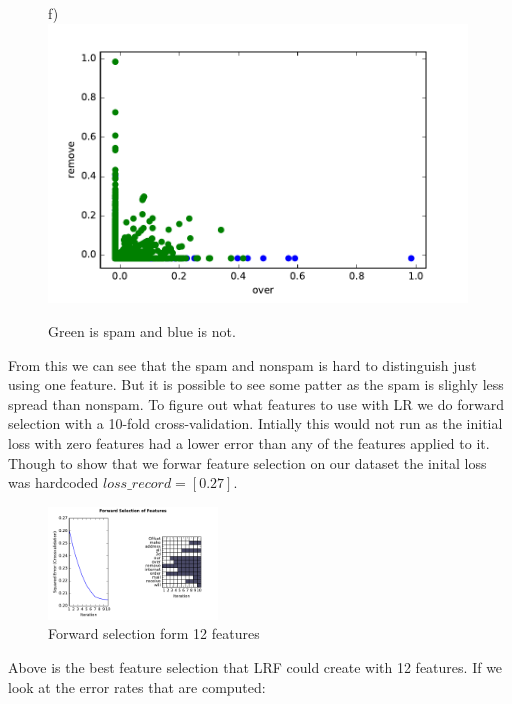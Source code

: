 \documentclass[10pt, paper=a4]{article}
\begin{document}
\begin{figure}[h]
\begin{minipage}{0.3\textwidth}
  \end{minipage} \hfill
  \begin{minipage}{0.3\textwidth}
    f)\\
    \includegraphics[width = 0.99\textwidth]{../../src/img/over_remove.pdf}
  \end{minipage} \vfill
    \caption{Green is spam and blue is not.}
  \label{fig:modelcheck}
\end{figure}

From this we can see that the spam and nonspam is hard to distinguish
just using one feature. But it is possible to see some patter as the
spam is slighly less spread than nonspam.
\newpage
To figure out what features to use with LR we do forward selection
with a 10-fold cross-validation. Intially this would not run as the
initial loss with zero features had a lower error than any of the
features applied to it. Though to show that we forwar feature
selection on our dataset the inital loss was hardcoded
$loss\_record=[0.27]$.

\begin{figure}[h]
  \centering
  \includegraphics[width = 0.4\textwidth]{../../src/img/best_forward_selection.pdf}
  \caption{Forward selection form 12 features}
  \label{fig:gam}
\end{figure}

Above is the best feature selection that LRF could create with 12
features.  If we look at the error rates that are
computed:
\end{document}

